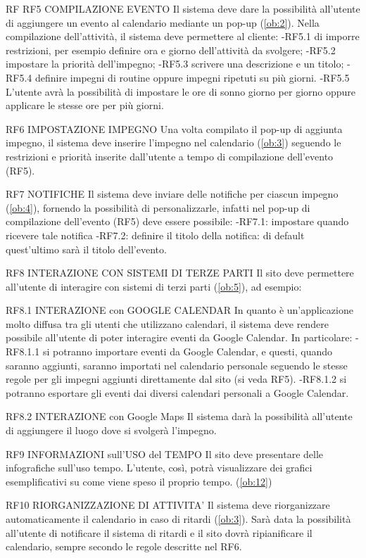 \begin {listaPersonale}{RF}
RF5 COMPILAZIONE EVENTO 
Il sistema deve dare la possibilità all'utente di aggiungere un evento al calendario mediante un pop-up (\ref{ob:2}). 
Nella compilazione dell’attività, il sistema deve permettere al cliente: 
	-RF5.1 di imporre restrizioni, per esempio definire ora e giorno dell’attività da svolgere; 
	-RF5.2 impostare la priorità dell'impegno;
	-RF5.3 scrivere una descrizione e un titolo;
	-RF5.4 definire impegni di routine oppure impegni ripetuti su 
	più giorni. 
-RF5.5 L’utente avrà la possibilità di impostare le ore di sonno giorno per giorno oppure applicare le stesse ore per più giorni.

RF6 IMPOSTAZIONE IMPEGNO
Una volta compilato il pop-up di aggiunta impegno, il sistema deve inserire l'impegno nel calendario (\ref{ob:3}) seguendo le restrizioni e priorità inserite dall'utente a tempo di compilazione dell'evento (RF5).


RF7 NOTIFICHE
Il sistema deve inviare delle notifiche per ciascun impegno (\ref{ob:4}), fornendo la possibilità di 
personalizzarle, infatti nel pop-up di compilazione dell'evento (RF5) deve essere possibile: 
	-RF7.1: impostare quando ricevere tale notifica
	-RF7.2: definire il titolo della notifica: di default quest'ultimo sarà il titolo dell’evento.

RF8 INTERAZIONE CON SISTEMI DI TERZE PARTI
Il sito deve permettere all’utente di interagire con sistemi di terzi parti (\ref{ob:5}), ad esempio:

RF8.1 INTERAZIONE con GOOGLE CALENDAR
In quanto è un'applicazione molto diffusa tra gli utenti che utilizzano calendari,
il sistema deve rendere possibile all'utente di poter interagire eventi da Google Calendar. 
In particolare: 
	-RF8.1.1 si potranno importare eventi da Google Calendar, e questi, quando saranno aggiunti, saranno importati nel calendario personale seguendo le stesse regole per gli impegni aggiunti direttamente dal sito (si veda RF5).
	-RF8.1.2 si potranno esportare gli eventi dai diversi calendari personali a Google Calendar.

RF8.2 INTERAZIONE con Google Maps
Il sistema darà la possibilità all’utente di aggiungere il luogo dove si svolgerà l’impegno.


RF9 INFORMAZIONI sull’USO del TEMPO
Il sito deve presentare delle infografiche sull'uso tempo. L'utente, così, potrà
visualizzare dei grafici esemplificativi su come viene speso il proprio tempo. 
(\ref{ob:12})

RF10 RIORGANIZZAZIONE DI ATTIVITA' 
Il sistema deve riorganizzare automaticamente il calendario in caso di ritardi (\ref{ob:3}). Sarà data la possibilità all'utente di notificare il sistema di ritardi e il sito dovrà ripianificare il calendario, sempre secondo le regole descritte nel RF6. 


\end{listaPersonale}
